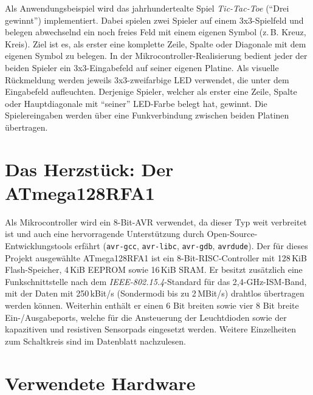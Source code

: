 \documentclass{clt2012}
\begin{document}
Als Anwendungsbeispiel wird das jahrhundertealte Spiel \emph{Tic-Tac-Toe} ("`Drei gewinnt"') \cite{tictactoe} implementiert. 
Dabei spielen zwei Spieler auf einem 3x3-Spielfeld und belegen abwechselnd ein noch freies Feld mit einem eigenen
Symbol (z.\,B. Kreuz, Kreis). Ziel ist es, als erster eine komplette Zeile, Spalte oder Diagonale
mit dem eigenen Symbol zu belegen.
In der Mikrocontroller-Realisierung bedient jeder der beiden Spieler ein 3x3-Eingabefeld auf seiner eigenen Platine.
Als visuelle Rückmeldung werden jeweils 3x3-zweifarbige LED verwendet, die unter dem Eingabefeld aufleuchten.
Derjenige Spieler, welcher als erster eine Zeile, Spalte oder Hauptdiagonale mit "`seiner"' LED-Farbe belegt hat, gewinnt.
Die Spielereingaben werden über eine Funkverbindung zwischen beiden Platinen übertragen.

\section{Das Herzstück: Der ATmega128RFA1}

Als Mikrocontroller wird ein 8-Bit-AVR verwendet, da dieser Typ weit verbreitet ist und auch eine
hervorragende Unterstützung durch Open-Source-Entwicklungstools erfährt
(\texttt{avr-gcc}, \texttt{avr-libc}, \texttt{avr-gdb}, \texttt{avrdude}).
Der für dieses Projekt ausgewählte \mbox{ATmega128RFA1} \cite{atmega} ist ein 8-Bit-RISC-Controller
mit 128\,KiB Flash-Speicher, 4\,KiB EEPROM sowie 16\,KiB SRAM.
Er besitzt zusätzlich eine Funkschnittstelle nach dem \emph{IEEE-802.15.4}-Standard
für das 2,4-GHz-ISM-Band, mit der Daten mit 250\,kBit/s (Sondermodi bis zu 2\,MBit/s)
drahtlos übertragen werden können. Weiterhin enthält er einen 6 Bit breiten sowie vier
8 Bit breite Ein-/Ausgabeports, welche für die Ansteuerung der Leuchtdioden sowie der kapazitiven
und resistiven Sensorpads eingesetzt werden.
Weitere Einzelheiten zum Schaltkreis sind im Datenblatt \cite{atmega} nachzulesen.

\section{Verwendete Hardware}
\end{document}
